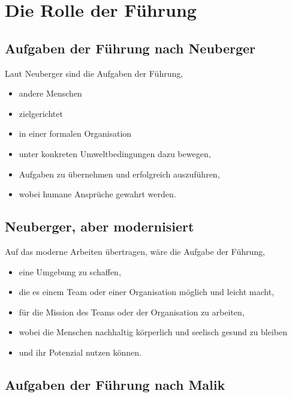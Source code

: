 \section{Die Rolle der Führung}
\label{fuehrung-rolle}

\subsection{Aufgaben der Führung nach Neuberger}
\label{fuehrung-aufgaben-neuberger}

Laut Neuberger\cite{neuberger-fuehren} sind die Aufgaben der Führung,

\begin{itemize}
    \item andere Menschen
    \item zielgerichtet
    \item in einer formalen Organisation
    \item unter konkreten Umweltbedingungen dazu bewegen,
    \item Aufgaben zu übernehmen und erfolgreich auszuführen,
    \item wobei humane Ansprüche gewahrt werden.
\end{itemize}

\subsection{Neuberger, aber modernisiert}

Auf das moderne Arbeiten übertragen, wäre die Aufgabe der Führung,

\begin{itemize}
    \item eine Umgebung zu schaffen,
    \item die es einem Team oder einer Organisation möglich und leicht macht,
    \item für die Mission des Teams oder der Organisation zu arbeiten,
    \item wobei die Menschen nachhaltig körperlich und seelisch gesund zu bleiben
    \item und ihr Potenzial nutzen können.
\end{itemize}

\subsection{Aufgaben der Führung nach Malik}
\label{fuehrung-aufgaben-malik}

